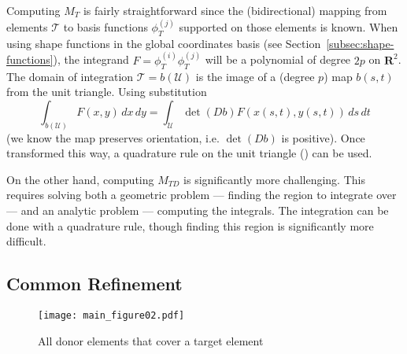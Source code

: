 \documentclass[oneside, reqno]{amsart}
\theoremstyle{definition}
\newcommand{\reals}{\mathbf{R}}
\newcommand{\utri}{\mathcal{U}}
\begin{document}
Computing \(M_T\) is fairly straightforward since the (bidirectional) mapping
from elements \(\mathcal{T}\) to basis functions \(\phi_T^{(j)}\) supported
on those elements is known. When using shape functions in the
global coordinates basis (see Section~\ref{subsec:shape-functions}), the
integrand \(F = \phi_T^{(i)} \phi_T^{(j)}\) will be a polynomial of degree
\(2p\) on \(\reals^2\). The domain of integration \(\mathcal{T}
= b\left(\utri\right)\) is the image of a (degree \(p\)) map \(b(s, t)\)
from the unit triangle. Using substitution
\begin{equation}\label{eq:mass-mat-subst}
\int_{b\left(\utri\right)} F(x, y) \, dx \, dy =
  \int_{\utri} \det(Db) F\left(x(s, t), y(s, t)\right) \, ds \, dt
\end{equation}
(we know the map preserves orientation, i.e. \(\det(Db)\) is positive).
Once transformed this way, a quadrature rule on the unit
triangle (\cite{Dunavant1985}) can be used.

On the other hand, computing \(M_{TD}\) is significantly more
challenging. This requires solving both a geometric problem ---
finding the region to integrate over --- and an analytic
problem --- computing the integrals. The integration can be done with
a quadrature rule, though finding this region is significantly
more difficult.

\subsection{Common Refinement}

\begin{figure}
  \texttt{[image: main\_figure02.pdf]}
  \centering
  \captionsetup{width=.75\linewidth}
  \caption{All donor elements that cover a target element}
  \label{fig:target-elt-all-matching}
\end{figure}
\end{document}
